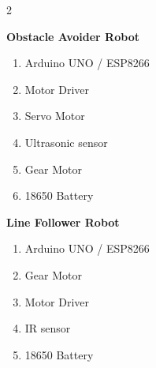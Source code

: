 \begin{multicols}{2}












\textbf{Obstacle Avoider Robot}
\begin{enumerate}
   \item Arduino UNO / ESP8266
   \item Motor Driver
   \item Servo Motor
   \item Ultrasonic sensor
   \item Gear Motor
   \item 18650 Battery
\end{enumerate}

\textbf{Line Follower Robot}
\begin{enumerate}
   \item Arduino UNO / ESP8266
   \item Gear Motor
   \item Motor Driver
   \item IR sensor
   \item 18650 Battery
\end{enumerate}


\end{multicols}
